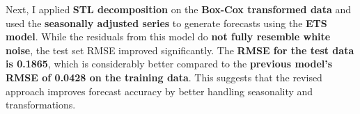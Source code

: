 \documentclass[
]{article}
\begin{document}
Next, I applied \textbf{STL decomposition} on the \textbf{Box-Cox
transformed data} and used the \textbf{seasonally adjusted series} to
generate forecasts using the \textbf{ETS model}. While the residuals
from this model do \textbf{not fully resemble white noise}, the test set
RMSE improved significantly. The \textbf{RMSE for the test data is
0.1865}, which is considerably better compared to the \textbf{previous
model's RMSE of 0.0428 on the training data}. This suggests that the
revised approach improves forecast accuracy by better handling
seasonality and transformations.
\end{document}
